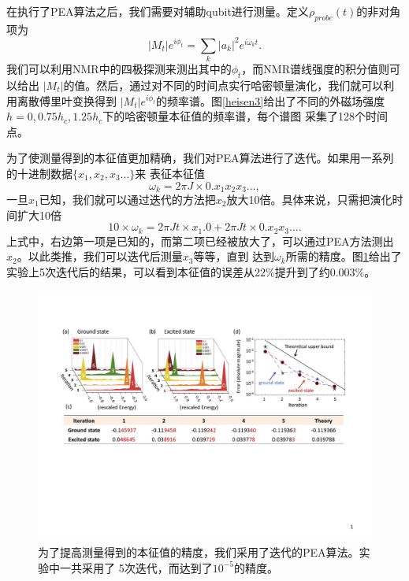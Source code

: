 在执行了PEA算法之后，我们需要对辅助qubit进行测量。定义$\rho_{probe}(t)$的非对角项为
\begin{equation}
|M_t|e^{i\phi_t}= \sum_k |a_k|^2e^{i\omega_k t}.
\end{equation}
我们可以利用NMR中的四极探测来测出其中的$\phi_t$，而NMR谱线强度的积分值则可以给出
$|M_t|$的值。然后，通过对不同的时间点实行哈密顿量演化，我们就可以利用离散傅里叶变换得到
$|M_t|e^{i\phi_t}$的频率谱。图\ref{heisen3}给出了不同的外磁场强度$h = 0,0.75h_c,1.25h_c$下的哈密顿量本征值的频率谱，每个谱图
采集了128个时间点。

为了使测量得到的本征值更加精确，我们对PEA算法进行了迭代。如果用一系列的十进制数据$\{x_1,x_2,x_3\ldots\}$来
表征本征值
\begin{equation}
\omega_k = 2\pi J\times 0.x_1x_2x_3\ldots,
\end{equation}
一旦$x_1$已知，我们就可以通过迭代的方法把$x_2$放大10倍。具体来说，只需把演化时间扩大10倍
\begin{equation}
10\times\omega_k = 2\pi J t \times x_1. 0 + 2\pi J t \times 0.x_2x_3\ldots.
\end{equation}
上式中，右边第一项是已知的，而第二项已经被放大了，可以通过PEA方法测出$x_2$。以此类推，我们可以迭代后测量$x_3$等等，直到
达到$\omega_k$所需的精度。图\ref{heisen4}给出了实验上5次迭代后的结果，可以看到本征值的误差从22$\%$提升到了约0.003$\%$。

 \begin{figure}[htbp]
            \begin{center}
              \includegraphics[width= 0.8\columnwidth]{figures/heisen4.pdf}
              \caption{为了提高测量得到的本征值的精度，我们采用了迭代的PEA算法。实验中一共采用了
              5次迭代，而达到了$10^{-5}$的精度。}\label{heisen4}
            \end{center}
 \end{figure}
 
